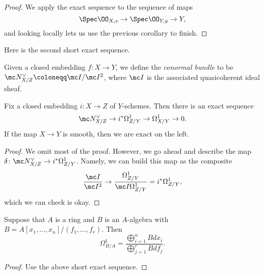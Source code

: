 \documentclass[../notes.tex]{subfiles}
\begin{document}
\begin{proof}
	We apply the exact sequence to the sequence of maps
	\[\Spec\OO_{X,x}\to\Spec\OO_{Y,y}\to Y,\]
	and looking locally lets us use the previous corollary to finish.
\end{proof}
Here is the second short exact sequence.
\begin{definition}
	Given a closed embedding $f\colon X\to Y$, we define the \textit{conormal bundle} to be $\mc N_{X/Z}^\lor\coloneqq\mc I/\mc I^2$, where $\mc I$ is the associated quasicoherent ideal sheaf.
\end{definition}
\begin{proposition} \label{prop:diff-ses-2}
	Fix a closed embedding $i\colon X\to Z$ of $Y$-schemes. Then there is an exact sequence
	\[\mc N_{X/Z}^\lor\to i^*\Omega^1_{Z/Y}\to\Omega^1_{X/Y}\to0.\]
	If the map $X\to Y$ is smooth, then we are exact on the left.
\end{proposition}
\begin{proof}
	We omit most of the proof. However, we go ahead and describe the map $\delta\colon\mc N_{X/Z}^\lor\to i^*\Omega^1_{Z/Y}$. Namely, we can build this map as the composite
	\[\frac{\mc I}{\mc I^2}\to\frac{\Omega^1_{Z/Y}}{\mc I\Omega^1_{Z/Y}}=i^*\Omega^1_{Z/Y},\]
	which we can check is okay.
\end{proof}
\begin{corollary} \label{cor:compute-diffs}
	Suppose that $A$ is a ring and $B$ is an $A$-algebra with $B=A[x_1,\ldots,x_n]/(f_1,\ldots,f_r)$. Then
	\[\Omega^1_{B/A}=\frac{\bigoplus_{i=1}^nBdx_i}{\bigoplus_{j=1}^rBdf_j}.\]
\end{corollary}
\begin{proof}
	Use the above short exact sequence.
\end{proof}
\end{document}
